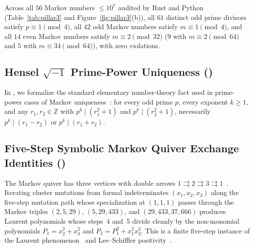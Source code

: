 \documentclass[11pt,reqno]{amsart}
\theoremstyle{plain}
\theoremstyle{definition}
\newcommand{\ZZ}{\mathbb{Z}}
\newcommand{\code}[1]{\texttt{\detokenize{#1}}}
\begin{document}
Across all $56$ Markov numbers $\le 10^7$ audited by Rust and Python (Table~\ref{tab:pillar3} and Figure~\ref{fig:pillar3}(b)), all $61$ distinct odd prime divisors satisfy $p \equiv 1 \pmod 4$, all $42$ odd Markov numbers satisfy $m \equiv 1 \pmod 4$, and all $14$ even Markov numbers satisfy $m \equiv 2 \pmod{32}$ ($9$ with $m \equiv 2 \pmod{64}$ and $5$ with $m \equiv 34 \pmod{64}$), with zero violations.

\subsection{Hensel \texorpdfstring{$\sqrt{-1}$}{sqrt(-1)} Prime-Power Uniqueness (\texorpdfstring{\code{T3c}}{T3c})}

In \code{T3c}, we formalize the standard elementary number-theory fact used in prime-power cases of Markov uniqueness~\cite{aigner2013}: for every odd prime $p$, every exponent $k \ge 1$, and any $r_1, r_2 \in \ZZ$ with $p^k \mid (r_1^2 + 1)$ and $p^k \mid (r_2^2 + 1)$, necessarily $p^k \mid (r_1 - r_2)$ or $p^k \mid (r_1 + r_2)$.

\subsection{Five-Step Symbolic Markov Quiver Exchange Identities (\texorpdfstring{\code{T3d}}{T3d})}

The Markov quiver has three vertices with double arrows $1 \rightrightarrows 2 \rightrightarrows 3 \rightrightarrows 1$~\cite{fz2002,ls2015}. Iterating cluster mutations from formal indeterminates $(x_1, x_2, x_3)$ along the five-step mutation path whose specialization at $(1,1,1)$ passes through the Markov triples $(2,5,29)$, $(5,29,433)$, and $(29,433,37{,}666)$ produces Laurent polynomials whose steps~4 and~5 divide cleanly by the non-monomial polynomials $P_1 = x_2^2 + x_3^2$ and $P_2 = P_1^2 + x_1^2 x_3^2$. This is a finite five-step instance of the Laurent phenomenon~\cite{fz2002} and Lee--Schiffler positivity~\cite{ls2015}.
\end{document}
